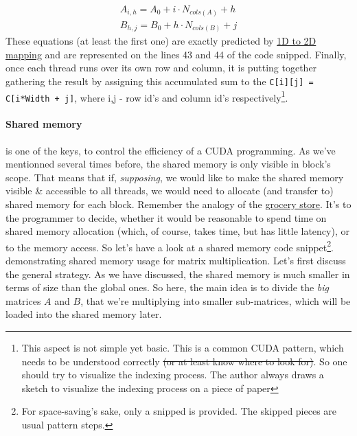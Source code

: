 \documentclass[12pt]{article}
\begin{document}
\vspace{-0.9cm}
\begin{gather*}
 A_{i, h} = A_{0} + i\cdot N_{cols(A)} + h
\\
B_{h,j} = B_{0} + h \cdot N_{cols(B)} + j
\end{gather*}
These equations (at least the first one) are exactly predicted by \hyperref[intermezzo1d2d]{1D to 2D mapping} and
are represented on the lines 43 and 44 of the code snipped. 
Finally, once each thread runs over its own row and column, it is putting together 
gathering the result by assigning this accumulated sum to the \verb|C[i][j] = C[i*Width + j]|, where i,j - row id's and column id's respectively\footnote{This 
aspect is not simple yet basic. This is a common CUDA pattern, which needs to be understood correctly 
\sout{(or at least know where to look for)}. So one should try to visualize the indexing process. The author always draws a sketch to visualize the indexing process on a piece of paper}.




\paragraph*{Shared memory} is one of the keys, to control the efficiency of a CUDA programming. 
As we've mentionned several times before, the shared memory is only visible in block's scope. That means that 
if, \textit{supposing}, we would like to make the shared memory visible \& accessible to all threads, we would 
need to allocate (and transfer to) shared memory for each block. Remember the analogy of the \hyperref[grocery_store]{grocery store}.
It's to the programmer to decide, whether it would be reasonable to spend time on shared memory allocation
 (which, of course, takes time, but has little latency), or to the memory access.
So let's have a look at a shared memory code snippet\footnote{For space-saving's sake, only a snipped is provided. The skipped pieces are usual pattern steps.}.
demonstrating shared memory usage for matrix multiplication. 
Let's first discuss the general strategy. As we have discussed, the shared memory is much smaller in terms of size 
than the global ones. So here, the main idea is to divide the \textit{big} matrices $A$ and $B$, that we're multiplying into smaller
sub-matrices, which will be loaded into the shared memory later.
\end{document}
